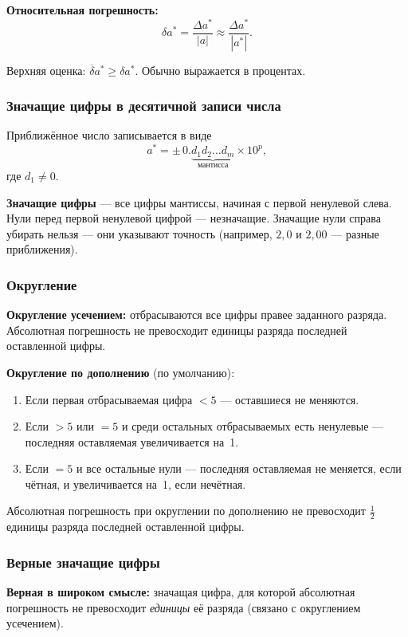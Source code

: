 \textbf{Относительная погрешность:}
\[
    \delta a^* = \frac{\Delta a^*}{|a|} \approx \frac{\Delta a^*}{|a^*|}.
\]

Верхняя оценка: $\overline{\delta} a^* \geq \delta a^*$. Обычно выражается в процентах.

\subsubsection*{Значащие цифры в десятичной записи числа}

Приближённое число записывается в виде
\[
    a^* = \pm\, 0.\underbrace{d_1 d_2 \ldots d_m}_{\text{мантисса}} \times 10^p,
\]
где $d_1 \neq 0$.

\textbf{Значащие цифры} --- все цифры мантиссы, начиная с первой ненулевой слева. Нули перед первой ненулевой цифрой --- незначащие. Значащие нули справа убирать нельзя --- они указывают точность (например, $2{,}0$ и $2{,}00$ --- разные приближения).

\subsubsection*{Округление}

\textbf{Округление усечением:} отбрасываются все цифры правее заданного разряда. Абсолютная погрешность не превосходит единицы разряда последней оставленной цифры.

\textbf{Округление по дополнению} (по умолчанию):
\begin{enumerate}
    \item Если первая отбрасываемая цифра $< 5$ --- оставшиеся не меняются.
    \item Если $> 5$ или $= 5$ и среди остальных отбрасываемых есть ненулевые --- последняя оставляемая увеличивается на~1.
    \item Если $= 5$ и все остальные нули --- последняя оставляемая не меняется, если чётная, и увеличивается на~1, если нечётная.
\end{enumerate}

Абсолютная погрешность при округлении по дополнению не превосходит $\frac{1}{2}$ единицы разряда последней оставленной цифры.

\subsubsection*{Верные значащие цифры}

\textbf{Верная в широком смысле:} значащая цифра, для которой абсолютная погрешность не превосходит \textit{единицы} её разряда (связано с округлением усечением).

